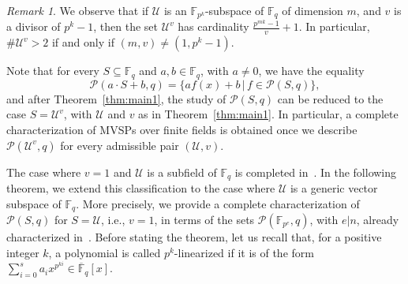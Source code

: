 \documentclass[11pt]{amsart}
\newcommand{\F}{\mathbb{F}}
\newcommand{\pp}{\mathcal P}
\theoremstyle{definition}
\theoremstyle{remark}
\newtheorem{remark}[theorem]{Remark}
\begin{document}
\begin{remark}\label{rem2.3}
We observe that if $\mathcal{U}$ is an $\mathbb{F}_{p^k}$-subspace of $\mathbb{F}_q$ of  dimension $m$, and $v$ is a divisor of $p^k-1$, then the set $\mathcal U^v$ has cardinality $\frac{p^{mk}-1}{v}+1$. In particular, $\#\mathcal U^v>2$ if and only if $(m, v)\ne (1, p^k-1)$. 
\end{remark}

Note that for every $S\subseteq \F_q$ and  $a, b\in \F_q$, with $a\ne 0$, we have the equality 
$$\mathcal P(a\cdot S+b, q)=\{af(x)+b\,|\, f\in \mathcal P(S, q)\},$$
and after  Theorem~\ref{thm:main1}, the  study  of $\mathcal P(S, q)$ can be reduced to the case $S=\mathcal U^v$, with $\mathcal U$ and $v$ as in Theorem~\ref{thm:main1}.   In particular, a complete characterization of MVSPs over finite fields is obtained once we describe $\pp(\mathcal U^v, q)$ for every admissible pair $(\mathcal U, v)$. 

The case where $v=1$ and $\mathcal U$ is a subfield of $\F_q$ is  completed in~\cite[Theorem 4.7]{Bor2}. In the following theorem, we extend this classification  to the case where $\mathcal U$ is a generic vector subspace of $\F_q$. More precisely, we provide a complete characterization of  $\mathcal{P}(S, q)$ for $S = \mathcal{U}$, i.e., $v=1$, in terms of the sets $\mathcal{P}(\F_{p^e}, q)$,  with $e | n$, already
characterized in~\cite{Bor2}.  Before stating the theorem,   let us recall that, for a positive integer $k$, a polynomial is called  $p^k$-linearized if it is of the form $\sum_{i=0}^s a_i x^{p^{ki}} \in \overline{\mathbb{F}}_q[x]$. 
\end{document}
